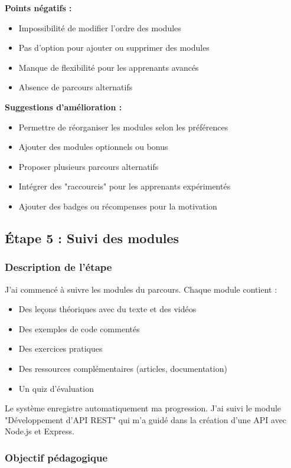 \documentclass[12pt,a4paper]{article}
\begin{document}
\textbf{Points négatifs :}
\begin{itemize}
    \item Impossibilité de modifier l'ordre des modules
    \item Pas d'option pour ajouter ou supprimer des modules
    \item Manque de flexibilité pour les apprenants avancés
    \item Absence de parcours alternatifs
\end{itemize}

\textbf{Suggestions d'amélioration :}
\begin{itemize}
    \item Permettre de réorganiser les modules selon les préférences
    \item Ajouter des modules optionnels ou bonus
    \item Proposer plusieurs parcours alternatifs
    \item Intégrer des "raccourcis" pour les apprenants expérimentés
    \item Ajouter des badges ou récompenses pour la motivation
\end{itemize}

\subsection{Étape 5 : Suivi des modules}

\subsubsection{Description de l'étape}

J'ai commencé à suivre les modules du parcours. Chaque module contient :
\begin{itemize}
    \item Des leçons théoriques avec du texte et des vidéos
    \item Des exemples de code commentés
    \item Des exercices pratiques
    \item Des ressources complémentaires (articles, documentation)
    \item Un quiz d'évaluation
\end{itemize}

Le système enregistre automatiquement ma progression. J'ai suivi le module "Développement d'API REST" qui m'a guidé dans la création d'une API avec Node.js et Express.

\subsubsection{Objectif pédagogique}
\end{document}
